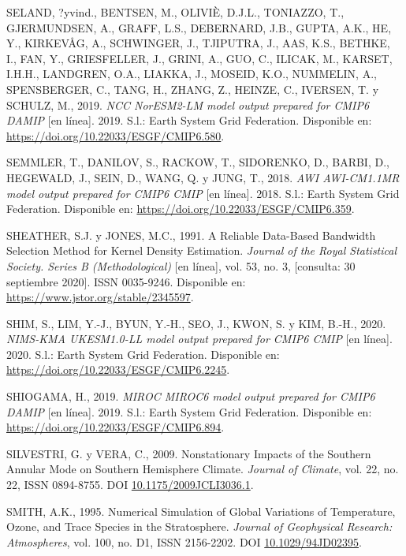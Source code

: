 \documentclass[12pt,oneside,a4paper]{reedthesis}
\newlength{\cslhangindent}
\newenvironment{CSLReferences}[2] %
 {%
  \setlength{\parindent}{0pt}
  \ifodd #1 \everypar{\setlength{\hangindent}{\cslhangindent}}\ignorespaces\fi
  \ifnum #2 > 0
  \setlength{\parskip}{#2\baselineskip}
  \fi
 }%
 {}
\begin{document}
\begin{CSLReferences}{1}{0}
\leavevmode{}%
SELAND, ?yvind., BENTSEN, M., OLIVIÈ, D.J.L., TONIAZZO, T., GJERMUNDSEN, A., GRAFF, L.S., DEBERNARD, J.B., GUPTA, A.K., HE, Y., KIRKEVÅG, A., SCHWINGER, J., TJIPUTRA, J., AAS, K.S., BETHKE, I., FAN, Y., GRIESFELLER, J., GRINI, A., GUO, C., ILICAK, M., KARSET, I.H.H., LANDGREN, O.A., LIAKKA, J., MOSEID, K.O., NUMMELIN, A., SPENSBERGER, C., TANG, H., ZHANG, Z., HEINZE, C., IVERSEN, T. y SCHULZ, M., 2019. \emph{NCC NorESM2-LM model output prepared for CMIP6 DAMIP} {[}en línea{]}. 2019. S.l.: Earth System Grid Federation. Disponible en: \url{https://doi.org/10.22033/ESGF/CMIP6.580}.

\leavevmode{}%
SEMMLER, T., DANILOV, S., RACKOW, T., SIDORENKO, D., BARBI, D., HEGEWALD, J., SEIN, D., WANG, Q. y JUNG, T., 2018. \emph{AWI AWI-CM1.1MR model output prepared for CMIP6 CMIP} {[}en línea{]}. 2018. S.l.: Earth System Grid Federation. Disponible en: \url{https://doi.org/10.22033/ESGF/CMIP6.359}.

\leavevmode{}%
SHEATHER, S.J. y JONES, M.C., 1991. A {Reliable Data-Based Bandwidth Selection Method} for {Kernel Density Estimation}. \emph{Journal of the Royal Statistical Society. Series B (Methodological)} {[}en línea{]}, vol. 53, no. 3, {[}consulta: 30 septiembre 2020{]}. ISSN 0035-9246. Disponible en: \url{https://www.jstor.org/stable/2345597}.

\leavevmode{}%
SHIM, S., LIM, Y.-J., BYUN, Y.-H., SEO, J., KWON, S. y KIM, B.-H., 2020. \emph{NIMS-KMA UKESM1.0-LL model output prepared for CMIP6 CMIP} {[}en línea{]}. 2020. S.l.: Earth System Grid Federation. Disponible en: \url{https://doi.org/10.22033/ESGF/CMIP6.2245}.

\leavevmode{}%
SHIOGAMA, H., 2019. \emph{MIROC MIROC6 model output prepared for CMIP6 DAMIP} {[}en línea{]}. 2019. S.l.: Earth System Grid Federation. Disponible en: \url{https://doi.org/10.22033/ESGF/CMIP6.894}.

\leavevmode{}%
SILVESTRI, G. y VERA, C., 2009. Nonstationary {Impacts} of the {Southern Annular Mode} on {Southern Hemisphere Climate}. \emph{Journal of Climate}, vol. 22, no. 22, ISSN 0894-8755. DOI \href{https://doi.org/10.1175/2009JCLI3036.1}{10.1175/2009JCLI3036.1}.

\leavevmode{}%
SMITH, A.K., 1995. Numerical Simulation of Global Variations of Temperature, Ozone, and Trace Species in the Stratosphere. \emph{Journal of Geophysical Research: Atmospheres}, vol. 100, no. D1, ISSN 2156-2202. DOI \href{https://doi.org/10.1029/94JD02395}{10.1029/94JD02395}.


\end{CSLReferences}
\end{document}
